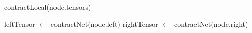 \documentclass{article}
\begin{document}
\newpage

\begin{algorithm}
\caption{Contraction}
\begin{algorithmic}

            \State \Return contractLocal(node.tensors)
        \EndIf
    
        \State leftTensor  $\gets$ contractNet(node.left)
        \State rightTensor  $\gets$ contractNet(node.right)
    
    \EndFunction

\end{algorithmic}
\end{algorithm}
\end{document}
